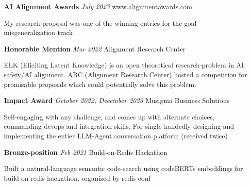 \documentclass[fontsize=11pt]{article}
\newcommand{\sepspace}{\vspace*{1em}}   %
\newcommand{\EducationEntry}[4]{
    \noindent \textbf{#1} \hfill      %
    \colorbox{Black}{
      \parbox{8.5em}{
      \hfill\color{White}#2}} \par  %
    \noindent \textit{#3} \par        %
    \noindent\hangindent=2em\hangafter=0 \small #4 %
    \normalsize \par}
\newcommand{\AwardEntry}[4]{         %
    \noindent \textbf{#1} \noindent \textit{#3} \hfill {#2} \par
    \noindent \small #4 %
    \normalsize \par}
\begin{document}
\AwardEntry{AI Alignment Awards}{www.alignmentawards.com}
{July 2023}
{My research-proposal was one of the winning entries for the \textquotedbl{}goal misgeneralization\textquotedbl{} track}
\sepspace
\AwardEntry{Honorable Mention}{Alignment Research Center}
{Mar 2022}
{ELK (Eliciting Latent Knowledge) is an open theoretical research-problem in AI safety/AI alignment. ARC (Alignment Research Center) hosted a competition for promisable proposals which could potentially solve this problem.}
\sepspace
\AwardEntry{Impact Award}{Musigma Business Solutions}
{October 2022, December 2023}
{Self-engaging with any challenge, and comes up with alternate choices, commanding devops and integration skills, For single-handedly designing and implementing the entier LLM-Agent conversation platform (received twice)}
\sepspace
\AwardEntry{Bronze-position}{Build-on-Redis Hackathon}
{Feb 2021}
{Built a natural-language semantic code-search using codeBERT\textquotesingle{}s embeddings for build-on-redis hackathon, organized by redis-conf}
\ 
\end{document}
